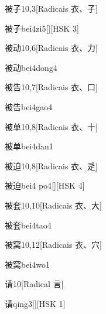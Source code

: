 \begin{entry}{被子}{10,3}[Radicais ⾐、⼦]
  \begin{phonetics}{被子}{bei4zi5}[][HSK 3]
  \end{phonetics}
\end{entry}

\begin{entry}{被动}{10,6}[Radicais ⾐、⼒]
  \begin{phonetics}{被动}{bei4dong4}
  \end{phonetics}
\end{entry}

\begin{entry}{被告}{10,7}[Radicais ⾐、⼝]
  \begin{phonetics}{被告}{bei4gao4}
  \end{phonetics}
\end{entry}

\begin{entry}{被单}{10,8}[Radicais ⾐、⼗]
  \begin{phonetics}{被单}{bei4dan1}
  \end{phonetics}
\end{entry}

\begin{entry}{被迫}{10,8}[Radicais ⾐、⾡]
  \begin{phonetics}{被迫}{bei4 po4}[][HSK 4]
  \end{phonetics}
\end{entry}

\begin{entry}{被套}{10,10}[Radicais ⾐、⼤]
  \begin{phonetics}{被套}{bei4tao4}
  \end{phonetics}
\end{entry}

\begin{entry}{被窝}{10,12}[Radicais ⾐、⽳]
  \begin{phonetics}{被窝}{bei4wo1}
  \end{phonetics}
\end{entry}

\begin{entry}{请}{10}[Radical ⾔]
  \begin{phonetics}{请}{qing3}[][HSK 1]
  \end{phonetics}
\end{entry}

